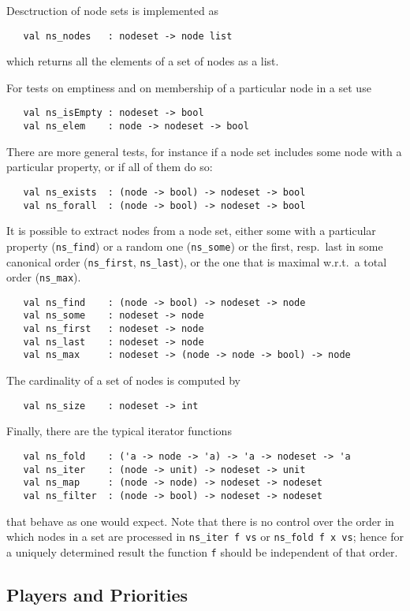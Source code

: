Desctruction of node sets is implemented as 
\begin{verbatim}
   val ns_nodes   : nodeset -> node list
\end{verbatim}
which returns all the elements of a set of nodes as a list.

For tests on emptiness and on membership of a particular node in a set use
\begin{verbatim}
   val ns_isEmpty : nodeset -> bool
   val ns_elem    : node -> nodeset -> bool
\end{verbatim}
There are more general tests, for instance if a node set includes some node with a particular property, or if all of them do so:
\begin{verbatim}
   val ns_exists  : (node -> bool) -> nodeset -> bool			
   val ns_forall  : (node -> bool) -> nodeset -> bool			
\end{verbatim}
It is possible to extract nodes from a node set, either some with a particular property (\verb#ns_find#) or a random one (\verb#ns_some#)
or the first, resp.\ last in some canonical order (\verb#ns_first#, \verb#ns_last#), or the one that is maximal w.r.t.\ a total order
(\verb#ns_max#).
\begin{verbatim} 
   val ns_find    : (node -> bool) -> nodeset -> node
   val ns_some    : nodeset -> node
   val ns_first   : nodeset -> node
   val ns_last    : nodeset -> node
   val ns_max     : nodeset -> (node -> node -> bool) -> node
\end{verbatim}
The cardinality of a set of nodes is computed by
\begin{verbatim}
   val ns_size    : nodeset -> int
\end{verbatim}
Finally, there are the typical iterator functions 
\begin{verbatim}
   val ns_fold    : ('a -> node -> 'a) -> 'a -> nodeset -> 'a
   val ns_iter    : (node -> unit) -> nodeset -> unit
   val ns_map     : (node -> node) -> nodeset -> nodeset
   val ns_filter  : (node -> bool) -> nodeset -> nodeset
\end{verbatim}
that behave as one would expect. Note that there is no control over the order in which nodes in a set are processed in \verb#ns_iter f vs# 
or \verb#ns_fold f x vs#; hence for a uniquely determined result the function \verb#f# should be independent of that order. 


\subsection{Players and Priorities}

